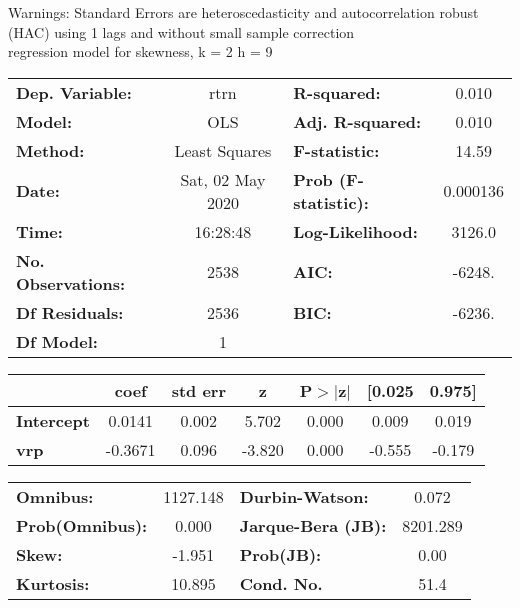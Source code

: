 Warnings: \newline
 [1] Standard Errors are heteroscedasticity and autocorrelation robust (HAC) using 1 lags and without small sample correction\\ 

regression model for skewness, k = 2 h = 9\begin{center}
\begin{tabular}{lclc}
\toprule
\textbf{Dep. Variable:}    &       rtrn       & \textbf{  R-squared:         } &     0.010   \\
\textbf{Model:}            &       OLS        & \textbf{  Adj. R-squared:    } &     0.010   \\
\textbf{Method:}           &  Least Squares   & \textbf{  F-statistic:       } &     14.59   \\
\textbf{Date:}             & Sat, 02 May 2020 & \textbf{  Prob (F-statistic):} &  0.000136   \\
\textbf{Time:}             &     16:28:48     & \textbf{  Log-Likelihood:    } &    3126.0   \\
\textbf{No. Observations:} &        2538      & \textbf{  AIC:               } &    -6248.   \\
\textbf{Df Residuals:}     &        2536      & \textbf{  BIC:               } &    -6236.   \\
\textbf{Df Model:}         &           1      & \textbf{                     } &             \\
\bottomrule
\end{tabular}
\begin{tabular}{lcccccc}
                   & \textbf{coef} & \textbf{std err} & \textbf{z} & \textbf{P$> |$z$|$} & \textbf{[0.025} & \textbf{0.975]}  \\
\midrule
\textbf{Intercept} &       0.0141  &        0.002     &     5.702  &         0.000        &        0.009    &        0.019     \\
\textbf{vrp}       &      -0.3671  &        0.096     &    -3.820  &         0.000        &       -0.555    &       -0.179     \\
\bottomrule
\end{tabular}
\begin{tabular}{lclc}
\textbf{Omnibus:}       & 1127.148 & \textbf{  Durbin-Watson:     } &    0.072  \\
\textbf{Prob(Omnibus):} &   0.000  & \textbf{  Jarque-Bera (JB):  } & 8201.289  \\
\textbf{Skew:}          &  -1.951  & \textbf{  Prob(JB):          } &     0.00  \\
\textbf{Kurtosis:}      &  10.895  & \textbf{  Cond. No.          } &     51.4  \\
\bottomrule
\end{tabular}
\end{center}

